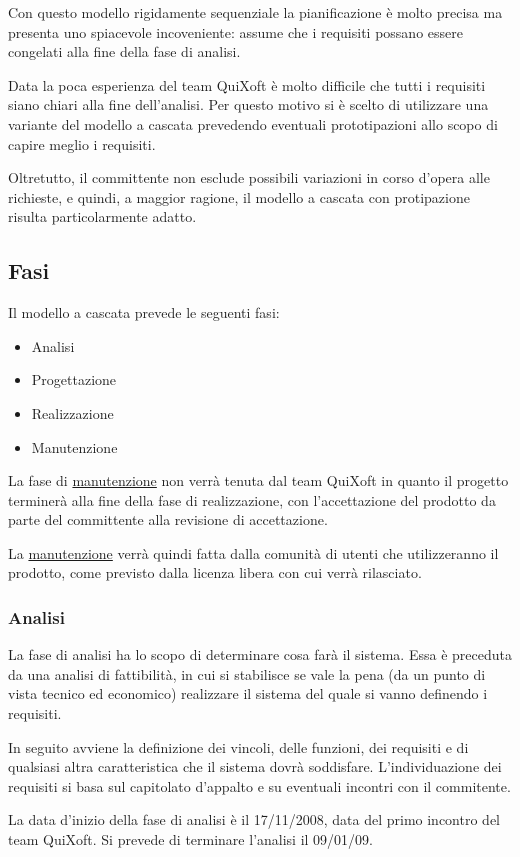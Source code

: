 \documentclass[11pt,a4paper]{article}
\begin{document}
Con questo modello rigidamente sequenziale la pianificazione è molto precisa ma presenta uno spiacevole incoveniente: assume che i requisiti possano essere congelati alla fine della fase di analisi.

Data la poca esperienza del team QuiXoft è molto difficile che tutti i requisiti siano chiari alla fine dell'analisi.
Per questo motivo si è scelto di utilizzare una variante del modello a cascata prevedendo eventuali prototipazioni allo scopo di capire meglio i requisiti.

Oltretutto, il committente non esclude possibili variazioni in corso d'opera alle richieste, e quindi, a maggior ragione, il modello a cascata con protipazione risulta particolarmente adatto.
\subsection{Fasi}
Il modello a cascata prevede le seguenti fasi:
\begin{itemize}
\item Analisi
\item Progettazione
\item Realizzazione
\item Manutenzione
\end{itemize}
\medskip
La fase di \underline{manutenzione} non verrà tenuta dal team QuiXoft in quanto il progetto terminerà alla fine della fase di realizzazione, con l'accettazione del prodotto da parte del committente alla revisione di accettazione.

La \underline{manutenzione} verrà quindi fatta dalla comunità di utenti che utilizzeranno il prodotto, come previsto dalla licenza libera con cui verrà rilasciato.
\subsubsection{Analisi}
La fase di analisi ha lo scopo di determinare cosa farà il sistema. Essa è preceduta da una analisi di fattibilità, in cui si stabilisce se vale la pena (da un punto di vista tecnico ed economico) realizzare il sistema del quale si vanno definendo i requisiti.

In seguito avviene la definizione dei vincoli, delle funzioni, dei requisiti e di qualsiasi altra caratteristica che il sistema dovrà soddisfare.
L'individuazione dei requisiti si basa sul capitolato d'appalto e su eventuali incontri con il commitente.

La data d'inizio della fase di analisi è il 17/11/2008, data del primo incontro del team QuiXoft. Si prevede di terminare l'analisi il 09/01/09.
\end{document}
